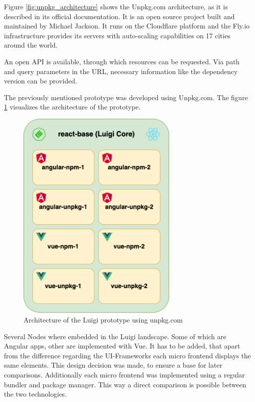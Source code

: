 Figure \ref{fig:unpkg_architecture} shows the Unpkg.com architecture, as it is described in its official documentation. It is an open source project built and maintained by Michael Jackson. It runs on the Cloudflare platform and the Fly.io infrastructure provides its servers with auto-scaling capabilities on 17 cities around the world.\cite{unpkg_doc}

An open API is available, through which resources can be requested. Via path and query parameters in the URL, necessary information like the dependency version can be provided.

The previously mentioned prototype was developed using Unpkg.com. The figure \ref{fig:unpkg_prototype_architecture} visualizes the architecture of the prototype.

\begin{figure}[!h]
	\centering
	\includegraphics[width=0.7\textwidth]{Figures/unpkg.architecture.drawio.png}
	\caption{Architecture of the Luigi prototype using unpkg.com}
	\label{fig:unpkg_prototype_architecture}
\end{figure}
\newpage
Several Nodes where embedded in the Luigi landscape. Some of which are Angular apps, other are implemented with Vue. It has to be added, that apart from the difference regarding the UI-Frameworks each micro frontend displays the same elements. This design decision was made, to ensure a base for later comparisons. Additionally each micro frontend was implemented using a regular bundler and package manager. This way a direct comparison is possible between the two technologies.

